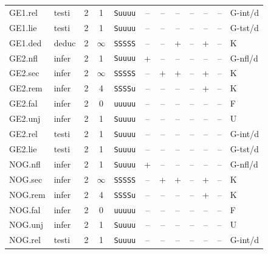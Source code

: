 {\begin{longtable}{@{}llcccccccccl@{}}
GE1.rel & testi & 2 & 1 & \texttt{Suuuu} & \textsf{--} & \textsf{--} & \textsf{--} & \textsf{--} & \textsf{--} & -- & G-int/d \\
GE1.lie & testi & 2 & 1 & \texttt{Suuuu} & \textsf{--} & \textsf{--} & \textsf{--} & \textsf{--} & \textsf{--} & -- & G-tst/d \\
GE1.ded & deduc & 2 & $\infty$ & \texttt{SSSSS} & \textsf{--} & \textsf{--} & \textsf{+} & \textsf{--} & \textsf{+} & -- & K \\
GE2.nfl & infer & 2 & 1 & \texttt{Suuuu} & \textsf{+} & \textsf{--} & \textsf{--} & \textsf{--} & \textsf{--} & -- & G-nfl/d \\
GE2.sec & infer & 2 & $\infty$ & \texttt{SSSSS} & \textsf{--} & \textsf{+} & \textsf{+} & \textsf{--} & \textsf{+} & -- & K \\
GE2.rem & infer & 2 & 4 & \texttt{SSSSu} & \textsf{--} & \textsf{--} & \textsf{--} & \textsf{--} & \textsf{+} & -- & K \\
GE2.fal & infer & 2 & 0 & \texttt{uuuuu} & \textsf{--} & \textsf{--} & \textsf{--} & \textsf{--} & \textsf{--} & -- & F \\
GE2.unj & infer & 2 & 1 & \texttt{Suuuu} & \textsf{--} & \textsf{--} & \textsf{--} & \textsf{--} & \textsf{--} & -- & U \\
GE2.rel & testi & 2 & 1 & \texttt{Suuuu} & \textsf{--} & \textsf{--} & \textsf{--} & \textsf{--} & \textsf{--} & -- & G-int/d \\
GE2.lie & testi & 2 & 1 & \texttt{Suuuu} & \textsf{--} & \textsf{--} & \textsf{--} & \textsf{--} & \textsf{--} & -- & G-tst/d \\
NOG.nfl & infer & 2 & 1 & \texttt{Suuuu} & \textsf{+} & \textsf{--} & \textsf{--} & \textsf{--} & \textsf{--} & -- & G-nfl/d \\
NOG.sec & infer & 2 & $\infty$ & \texttt{SSSSS} & \textsf{--} & \textsf{+} & \textsf{+} & \textsf{--} & \textsf{+} & -- & K \\
NOG.rem & infer & 2 & 4 & \texttt{SSSSu} & \textsf{--} & \textsf{--} & \textsf{--} & \textsf{--} & \textsf{+} & -- & K \\
NOG.fal & infer & 2 & 0 & \texttt{uuuuu} & \textsf{--} & \textsf{--} & \textsf{--} & \textsf{--} & \textsf{--} & -- & F \\
NOG.unj & infer & 2 & 1 & \texttt{Suuuu} & \textsf{--} & \textsf{--} & \textsf{--} & \textsf{--} & \textsf{--} & -- & U \\
NOG.rel & testi & 2 & 1 & \texttt{Suuuu} & \textsf{--} & \textsf{--} & \textsf{--} & \textsf{--} & \textsf{--} & -- & G-int/d \\

\end{longtable}}
